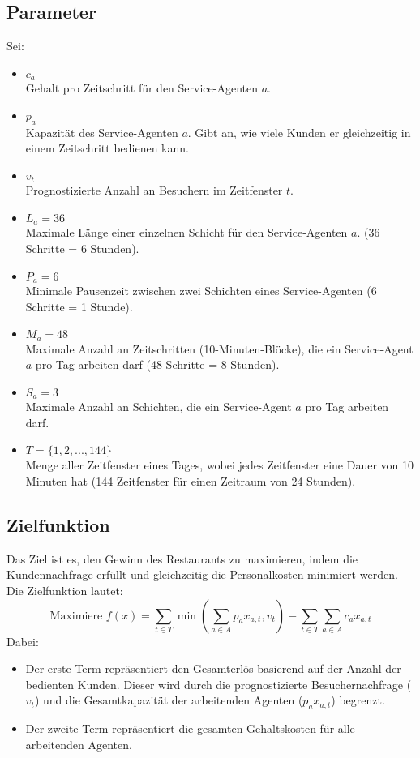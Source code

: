 \subsection*{Parameter}
Sei:
\begin{itemize}
    \item $ c_a $\\
          Gehalt pro Zeitschritt für den Service-Agenten $ a $.
    \item $ p_a $\\
          Kapazität des Service-Agenten $ a $. Gibt an, wie viele Kunden er gleichzeitig in einem Zeitschritt bedienen kann.
    \item $ v_t $\\
          Prognostizierte Anzahl an Besuchern im Zeitfenster $ t $.
    \item $ L_a = 36 $\\
          Maximale Länge einer einzelnen Schicht für den Service-Agenten $ a $. (36 Schritte = 6 Stunden).
    \item $ P_a = 6 $\\
          Minimale Pausenzeit zwischen zwei Schichten eines Service-Agenten (6 Schritte = 1 Stunde).
    \item $ M_a = 48 $\\
          Maximale Anzahl an Zeitschritten (10-Minuten-Blöcke), die ein Service-Agent $ a $ pro Tag arbeiten darf (48 Schritte = 8 Stunden).
    \item $ S_a = 3 $\\
          Maximale Anzahl an Schichten, die ein Service-Agent $ a $ pro Tag arbeiten darf.
    \item $ T = \{1, 2, ..., 144\}$\\
          Menge aller Zeitfenster eines Tages, wobei jedes Zeitfenster eine Dauer von 10 Minuten hat (144 Zeitfenster für einen Zeitraum von 24 Stunden).
\end{itemize}

\subsection*{Zielfunktion}
Das Ziel ist es, den Gewinn des Restaurants zu maximieren, indem die Kundennachfrage erfüllt und gleichzeitig die Personalkosten minimiert werden. Die Zielfunktion lautet:
$$\text{Maximiere } f(x) = \sum_{t \in T} \min\left(\sum_{a \in A} p_a x_{a,t}, v_t\right) - \sum_{t \in T} \sum_{a \in A} c_a x_{a,t}$$
Dabei:
\begin{itemize}
    \item Der erste Term repräsentiert den Gesamterlös basierend auf der Anzahl der bedienten Kunden. Dieser wird durch die prognostizierte Besuchernachfrage ($v_t$) und die Gesamtkapazität der arbeitenden Agenten ($p_a x_{a,t}$) begrenzt.
    \item Der zweite Term repräsentiert die gesamten Gehaltskosten für alle arbeitenden Agenten.
\end{itemize}

